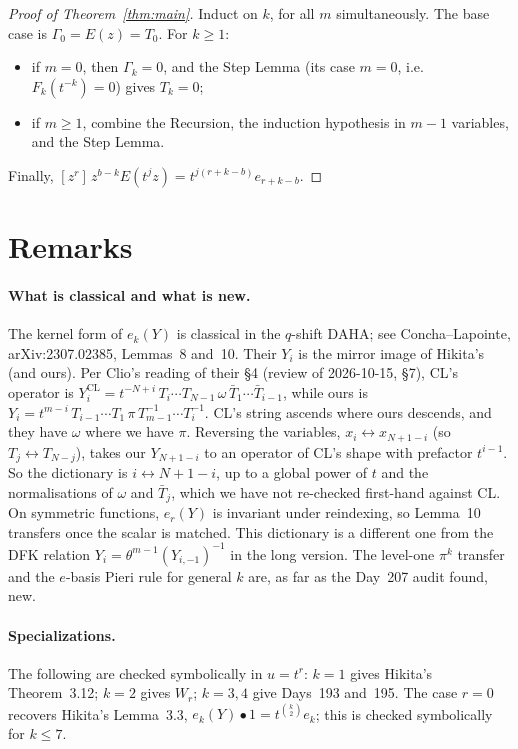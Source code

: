 \documentclass[11pt]{amsart}
\theoremstyle{remark}
\begin{document}
\begin{proof}[Proof of Theorem~\ref{thm:main}]
Induct on $k$, for all $m$ simultaneously. The base case is $\Gamma_0=E(z)=T_0$. For $k\ge1$:
\begin{itemize}
\item if $m=0$, then $\Gamma_k=0$, and the Step Lemma (its case $m=0$, i.e.\ $F_k(t^{-k})=0$) gives $T_k=0$;
\item if $m\ge1$, combine the Recursion, the induction hypothesis in $m-1$ variables, and the Step Lemma.
\end{itemize}
Finally, $[z^r]\,z^{b-k}E(t^jz)=t^{j(r+k-b)}e_{r+k-b}$.
\end{proof}

\section{Remarks}

\paragraph{What is classical and what is new.} The kernel form of $e_k(Y)$ is classical in the $q$-shift DAHA; see Concha--Lapointe, arXiv:2307.02385, Lemmas~8 and~10. Their $Y_i$ is the mirror image of Hikita's (and ours). Per Clio's reading of their \S4 (review of 2026-10-15, \S7), CL's operator is $Y^{\mathrm{CL}}_i=t^{-N+i}\,T_i\cdots T_{N-1}\,\omega\,\bar T_1\cdots\bar T_{i-1}$, while ours is $Y_i=t^{m-i}\,T_{i-1}\cdots T_1\,\pi\,T_{m-1}^{-1}\cdots T_i^{-1}$. CL's string ascends where ours descends, and they have $\omega$ where we have $\pi$. Reversing the variables, $x_i\leftrightarrow x_{N+1-i}$ (so $T_j\leftrightarrow T_{N-j}$), takes our $Y_{N+1-i}$ to an operator of CL's shape with prefactor $t^{i-1}$. So the dictionary is $i\leftrightarrow N+1-i$, up to a global power of $t$ and the normalisations of $\omega$ and $\bar T_j$, which we have not re-checked first-hand against CL. On symmetric functions, $e_r(Y)$ is invariant under reindexing, so Lemma~10 transfers once the scalar is matched. This dictionary is a different one from the DFK relation $Y_i=\theta^{m-1}(Y_{i,-1})^{-1}$ in the long version. The level-one $\pi^k$ transfer and the $e$-basis Pieri rule for general $k$ are, as far as the Day~207 audit found, new.

\paragraph{Specializations.} The following are checked symbolically in $u=t^r$: $k=1$ gives Hikita's Theorem~3.12; $k=2$ gives $W_r$; $k=3,4$ give Days~193 and~195. The case $r=0$ recovers Hikita's Lemma~3.3, $e_k(Y)\bullet1=t^{\binom k2}e_k$; this is checked symbolically for $k\le7$.
\end{document}
